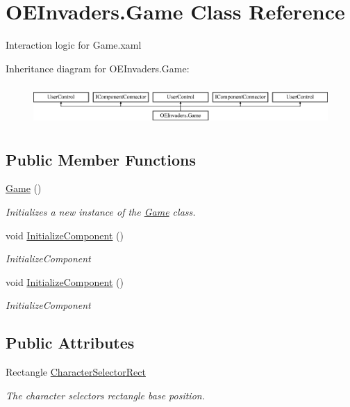\hypertarget{class_o_e_invaders_1_1_game}{}\section{O\+E\+Invaders.\+Game Class Reference}
\label{class_o_e_invaders_1_1_game}


Interaction logic for Game.\+xaml  


Inheritance diagram for O\+E\+Invaders.\+Game\+:\begin{figure}[H]
\begin{center}
\leavevmode
\includegraphics[height=1.544828cm]{class_o_e_invaders_1_1_game}
\end{center}
\end{figure}
\subsection*{Public Member Functions}
\begin{DoxyCompactItemize}
\item 
\mbox{\hyperlink{class_o_e_invaders_1_1_game_a923d7776f5d4e1f4eb653afc72bb715f}{Game}} ()
\begin{DoxyCompactList}\small\item\em Initializes a new instance of the \mbox{\hyperlink{class_o_e_invaders_1_1_game}{Game}} class. \end{DoxyCompactList}\item 
void \mbox{\hyperlink{class_o_e_invaders_1_1_game_a8157d9569e9d367f27b4c97b87c15d4f}{Initialize\+Component}} ()
\begin{DoxyCompactList}\small\item\em Initialize\+Component \end{DoxyCompactList}\item 
void \mbox{\hyperlink{class_o_e_invaders_1_1_game_a8157d9569e9d367f27b4c97b87c15d4f}{Initialize\+Component}} ()
\begin{DoxyCompactList}\small\item\em Initialize\+Component \end{DoxyCompactList}\end{DoxyCompactItemize}
\subsection*{Public Attributes}
\begin{DoxyCompactItemize}
\item 
Rectangle \mbox{\hyperlink{class_o_e_invaders_1_1_game_aa676962570ed4ef970cea41b08ca74ba}{Character\+Selector\+Rect}}
\begin{DoxyCompactList}\small\item\em The character selector\textquotesingle{}s rectangle base position. \end{DoxyCompactList}\end{DoxyCompactItemize}
